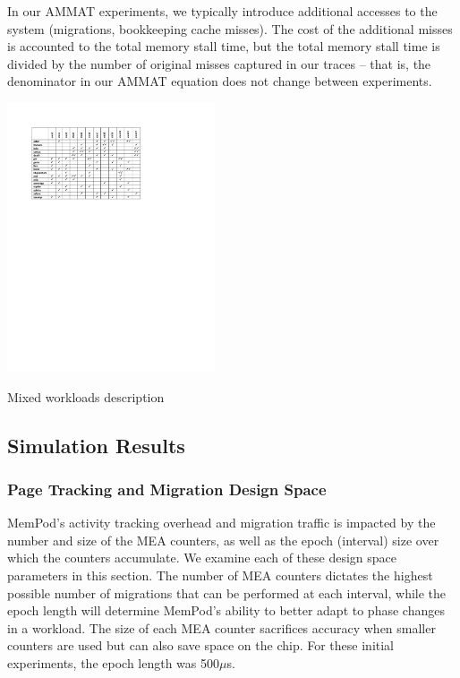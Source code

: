 In our AMMAT experiments, we typically introduce additional accesses to the
system (migrations, bookkeeping cache misses).  The cost of the additional
misses is accounted to the total memory stall time, but the total memory 
stall time is divided by the number of original misses captured in our traces
-- that is, the denominator in our AMMAT equation does not change between
experiments.
\begin{table}
  \includegraphics[width=0.46\textwidth]{figures/workloads_checkmarks.pdf}
  \caption{Mixed workloads description}
  \label{tab:workloads}
\end{table}

\subsection{Simulation Results}
\label{sub:SimResults}

\subsubsection{Page Tracking and Migration Design Space}

MemPod's activity tracking overhead and migration traffic is impacted by
the number and size of the MEA counters, as well as the epoch (interval) 
size over
which the counters accumulate.  We examine each of these design space
parameters in this section.
The number of MEA counters dictates the highest possible number of 
migrations that can be performed at each interval, while the epoch length will determine MemPod's ability to better adapt to phase changes in a workload. The size of each MEA counter sacrifices accuracy when smaller counters are used 
but can also save space on the chip.  For these initial experiments,
the epoch length was 500$\mu$s. 

